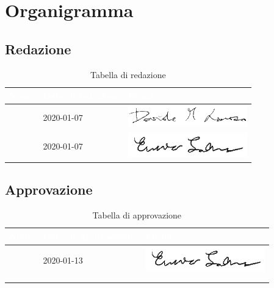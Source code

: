 \section{Organigramma}
\subsection{Redazione}
{
	\renewcommand{\arraystretch}{2}
	\begin{longtable}{ C{5cm} C{4cm} C{5cm} }
		\caption{Tabella di redazione}\\
		\textcolor{white}{\textbf{Nome}} & \textcolor{white}{\textbf{Data di redazione}} & \textcolor{white}{\textbf{Firma}}\\
		\endhead
        
        \LD{} & 2020-01-07 &
        \includegraphics[scale=0.60]{Sezioni/Firme/Davide.png}  \\
        \SE{} & 2020-01-07 &
        \includegraphics[scale=0.70]{Sezioni/Firme/Enrico.png}  \\
        		
	\end{longtable}
}

\subsection{Approvazione}
{
	\renewcommand{\arraystretch}{2}
	\centering
	\begin{longtable}{ C{5cm} C{4cm} C{5cm} }
		\caption{Tabella di approvazione}\\
		\textcolor{white}{\textbf{Nome}} & \textcolor{white}{\textbf{Data di Approvazione}} & \textcolor{white}{\textbf{Firma}}\\	\endhead
		
		
		\SE{} & 2020-01-13 &  
		\includegraphics[scale=0.70]{Sezioni/Firme/Enrico.png}\\
		\VT{} &  & \\
		\CR{} & &  \\
		
	\end{longtable}
}

